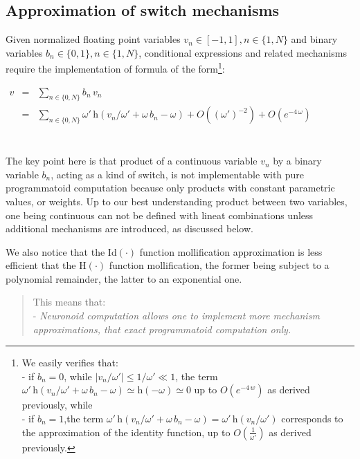 \documentclass[a4]{article} \usepackage[left=2cm,right=3cm,top=1cm,bottom=2cm]{geometry}
\newcommand{\eqline}[1]{~\vspace{0.1cm}\\\centerline{$#1$}\vspace{0.1cm}\\}
\newcommand{\tab}{\hphantom{4mm}}
\begin{document}
\subsection{Approximation of switch mechanisms}

Given normalized floating point variables $v_n \in [-1, 1], n \in \{1, N\}$ and binary variables $b_n \in \{0, 1\}, n \in \{1, N\}$, conditional expressions and related mechanisms require the implementation of formula of the form\footnote{We easily verifies that:
\\ - if $b_n= 0$, while $|v_n/\omega'| \le 1/\omega' \ll 1$, the term $\omega' \, \mbox{h}(v_n/\omega' + \omega \, b_n - \omega) \simeq \mbox{h}(- \omega) \simeq 0$ up to $O\left(e^{-4\,w}\right)$ as derived previously, while
\\ - if $b_n= 1$,the term $\omega' \, \mbox{h}(v_n/\omega' + \omega \, b_n - \omega) = \omega' \, \mbox{h}(v_n/\omega')$ corresponds to the approximation of the identity function, up to $O\left(\frac{1}{\omega'}\right)$ as derived previously.}:
\eqline{\begin{array}{rcl}
    v &=& \sum_{n \in \{0, N\}} b_n \, v_n \\
    &=& \sum_{n \in \{0, N\}} \omega' \, \mbox{h}(v_n/\omega' + \omega \, b_n - \omega) + O\left((\omega')^{-2}\right)+ O\left(e^{-4\,\omega}\right) \\
\end{array}}

The key point here is that product of a continuous variable $v_n$ by a binary variable $b_n$, acting as a kind of switch, is not implementable with pure programmatoid computation because only products with constant parametric values, or weights. Up to our best understanding product between two variables, one being continuous can not be defined with lineat combinations unless additional mechanisms are introduced, as discussed below.

We also notice that the $\mbox{Id}(\cdot)$ function mollification approximation is less efficient that the $\mbox{H}(\cdot)$ function mollification, the former being subject to a polynomial remainder, the latter to an exponential one.

\begin{quotation}
This means that:
\\\tab - {\em Neuronoid computation allows one to implement more mechanism approximations, that exact programmatoid computation only.}
\end{quotation}
\end{document}
